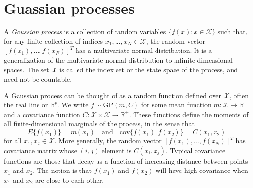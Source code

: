 \documentclass[10pt]{article}
\begin{document}
    \clearpage

    \section*{Guassian processes}

    A \textit{Gaussian process} is a collection of random variables $\{f(x): x \in \mathcal{X}\}$ such that, for any finite collection of indices $x_1, \ldots, x_N \in \mathcal{X}$, the random vector $[f(x_1), \ldots, f(x_N)]^T$ has a multivariate normal distribution.  It is a generalization of the multivariate normal distribution to infinite-dimensional spaces. The set $\mathcal{X}$ is called the index set or the state space of the process, and need not be countable.

    A Gaussian process can be thought of as a random function defined over $\mathcal{X}$, often the real line or $\mathbb{R}^p$.  We write $f \sim \mbox{GP}(m, C)$ for some mean function $m: \mathcal{X} \rightarrow \mathbb{R}$ and a covariance function $C: \mathcal{X} \times \mathcal{X} \rightarrow \mathbb{R}^+$.  These functions define the moments of all finite-dimensional marginals of the process, in the sense that
    $$
    E\{ f(x_1) \} = m(x_1) \quad \mbox{and} \quad \mbox{cov}\{f(x_1), f(x_2) \} = C(x_1, x_2)
    $$
    for all $x_1, x_2 \in \mathcal{X}$.  More generally, the random vector $[f(x_1), \ldots, f(x_N)]^T$ has covariance matrix whose $(i,j)$ element is $C(x_i, x_j)$.  Typical covariance functions are those that decay as a function of increasing distance between points $x_1$ and $x_2$.  The notion is that $f(x_1)$ and $f(x_2)$ will have high covariance when $x_1$ and $x_2$ are close to each other.
\end{document}
